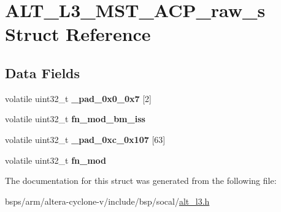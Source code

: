 \hypertarget{structALT__L3__MST__ACP__raw__s}{}\section{A\+L\+T\+\_\+\+L3\+\_\+\+M\+S\+T\+\_\+\+A\+C\+P\+\_\+raw\+\_\+s Struct Reference}
\label{structALT__L3__MST__ACP__raw__s}
\subsection*{Data Fields}
\begin{DoxyCompactItemize}
\item 
\mbox{\label{structALT__L3__MST__ACP__raw__s_afcba7a083231f1cb7deed42166e6dad7}} 
volatile uint32\+\_\+t {\bfseries \+\_\+pad\+\_\+0x0\+\_\+0x7} \mbox{[}2\mbox{]}
\item 
\mbox{\label{structALT__L3__MST__ACP__raw__s_a990d39d5ca103077b6193319137a0b76}} 
volatile uint32\+\_\+t {\bfseries fn\+\_\+mod\+\_\+bm\+\_\+iss}
\item 
\mbox{\label{structALT__L3__MST__ACP__raw__s_a7d0484bbe9b94fefd1341406686bf183}} 
volatile uint32\+\_\+t {\bfseries \+\_\+pad\+\_\+0xc\+\_\+0x107} \mbox{[}63\mbox{]}
\item 
\mbox{\label{structALT__L3__MST__ACP__raw__s_a59f26143eedc0cf21a6bec9989aaad6d}} 
volatile uint32\+\_\+t {\bfseries fn\+\_\+mod}
\end{DoxyCompactItemize}


The documentation for this struct was generated from the following file\+:\begin{DoxyCompactItemize}
\item 
bsps/arm/altera-\/cyclone-\/v/include/bsp/socal/\mbox{\hyperlink{alt__l3_8h}{alt\+\_\+l3.\+h}}\end{DoxyCompactItemize}
